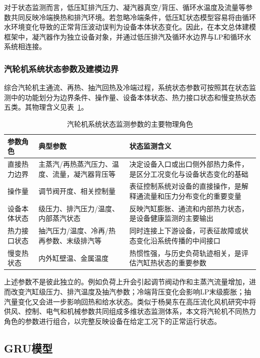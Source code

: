 对于状态监测而言，低压缸排汽压力、凝汽器真空/背压、循环水温度及流量等参数共同反映冷端换热和排汽环境。若忽略冷端条件，低压缸状态模型容易将由循环水环境变化导致的正常背压波动误判为设备本体状态变化。因此，在本文总体建模框架中，凝汽器作为独立设备对象，并通过低压排汽及循环水边界与LP和循环水系统相连接。

\subsubsection{汽轮机系统状态参数及建模边界}

综合汽轮机主通流、再热、抽汽回热及冷端过程，系统状态参数可按照其在状态监测中的功能划分为边界条件、操作量、设备本体状态、热力接口状态和慢变热状态五类。其物理含义见表~\ref{tab:turbine_parameter_roles_v3}。

\begin{table}[htbp]
\centering
\caption{汽轮机系统状态监测参数的主要物理角色}
\label{tab:turbine_parameter_roles_v3}
\small
\begin{tabular}{p{2.4cm}p{4.8cm}p{6.2cm}}
\toprule
参数角色 & 典型参数 & 状态监测含义\\
\midrule
直接热力边界 & 主蒸汽/再热蒸汽压力、温度、流量，凝汽器背压等 & 决定设备入口或出口侧外部热力条件，是区分工况变化与设备状态变化的基础\\
操作量 & 调节阀开度、相关控制量 & 表征控制系统对设备的直接操作，是解释通流量和压力分布变化的重要变量\\
设备本体状态 & 级压力、排汽压力/温度、内部蒸汽状态 & 反映汽缸膨胀、通流和内部热力状态，是设备健康监测的主要输出\\
热力接口状态 & 抽汽压力/温度、冷再/热再参数、末级排汽等 & 同时连接上下游设备，可表征故障或状态变化沿系统传播的中间接口\\
慢变热状态 & 内外缸壁温、金属温度 & 热惯性强，与历史负荷轨迹相关，是评估汽缸热状态的重要参数\\
\bottomrule
\end{tabular}
\end{table}

上述参数不是彼此独立的。例如负荷上升会引起调节阀动作和主蒸汽流量增加，进而改变汽缸级压力、排汽温度及抽汽参数；冷端背压变化会影响LP末级膨胀；抽汽量变化又会进一步影响回热和给水状态。类似于杨昊东在高压流化风机研究中将供风、控制、电气和机械参数共同组成多维状态监测体系，本文将汽轮机不同热力角色的参数进行组合，以完整反映设备在给定工况下的正常运行状态。

\subsection{GRU模型}
\label{subsec:gru_theory_v3}

